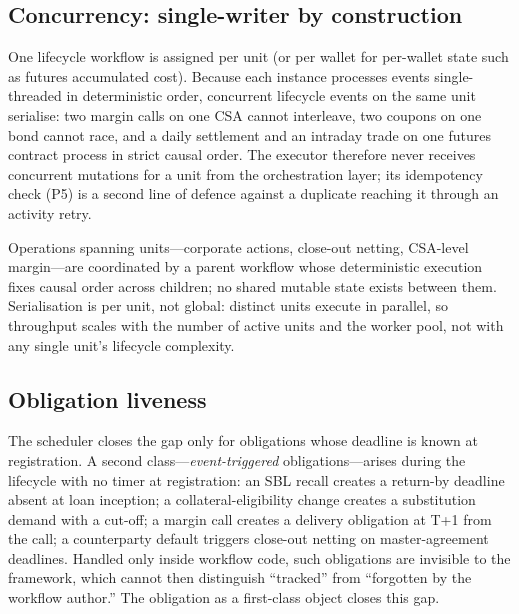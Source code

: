 \documentclass[11pt,a4paper]{article}
\begin{document}
\subsection{Concurrency: single-writer by construction}
\label{sec:temporal-concurrency}

One lifecycle workflow is assigned per unit (or per wallet for per-wallet state such as futures accumulated cost). Because each instance processes events single-threaded in deterministic order, concurrent lifecycle events on the same unit serialise: two margin calls on one CSA cannot interleave, two coupons on one bond cannot race, and a daily settlement and an intraday trade on one futures contract process in strict causal order. The executor therefore never receives concurrent mutations for a unit from the orchestration layer; its idempotency check (P5) is a second line of defence against a duplicate reaching it through an activity retry.

Operations spanning units---corporate actions, close-out netting, CSA-level margin---are coordinated by a parent workflow whose deterministic execution fixes causal order across children; no shared mutable state exists between them. Serialisation is per unit, not global: distinct units execute in parallel, so throughput scales with the number of active units and the worker pool, not with any single unit's lifecycle complexity.

\subsection{Obligation liveness}
\label{sec:obligation-liveness}

The scheduler closes the gap only for obligations whose deadline is known at registration. A second class---\emph{event-triggered} obligations---arises during the lifecycle with no timer at registration: an SBL recall creates a return-by deadline absent at loan inception; a collateral-eligibility change creates a substitution demand with a cut-off; a margin call creates a delivery obligation at T+1 from the call; a counterparty default triggers close-out netting on master-agreement deadlines. Handled only inside workflow code, such obligations are invisible to the framework, which cannot then distinguish ``tracked'' from ``forgotten by the workflow author.'' The obligation as a first-class object closes this gap.
\end{document}
